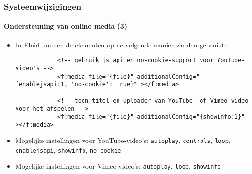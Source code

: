 \begin{frame}[fragile]
	\frametitle{Systeemwijzigingen}
	\framesubtitle{Ondersteuning van online media (3)}

	\lstset{basicstyle=\tiny\ttfamily}

	\begin{itemize}

		\item In Fluid kunnen de elementen op de volgende manier worden gebruikt:

		\begin{lstlisting}
			<!-- gebruik js api en no-cookie-support voor YouTube-video's -->
			<f:media file="{file}" additionalConfig="{enablejsapi:1, 'no-cookie': true}" ></f:media>

			<!-- toon titel en uploader van YouTube- of Vimeo-video voor het afspelen -->
			<f:media file="{file}" additionalConfig="{showinfo:1}" ></f:media>
		\end{lstlisting}

		\item Mogelijke instellingen voor YouTube-video's:\newline
			\small
				\texttt{autoplay}, \texttt{controls}, \texttt{loop}, \texttt{enablejsapi}, \texttt{showinfo}, \texttt{no-cookie}
			\normalsize

		\item Mogelijke instellingen voor Vimeo-video's:\newline
			\small
				\texttt{autoplay}, \texttt{loop}, \texttt{showinfo}
			\normalsize
	\end{itemize}

\end{frame}


